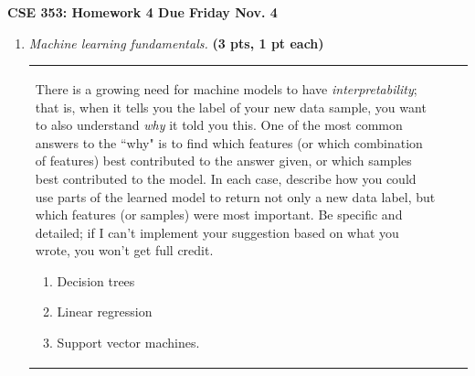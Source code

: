 \documentclass{article}
\newcommand{\mypagebreak}{\begin{center}
		\noindent\makebox[\linewidth]{\rule{7.5in}{1pt}}
	\end{center}}
\newcommand{\showpoints}[1]{\textbf{(#1)}}
\begin{document}
{\Large\textbf{CSE 353: Homework 4 \hfill
Due Friday  Nov. 4}}


\mypagebreak

\begin{enumerate}



\item \emph{Machine learning fundamentals.}  \showpoints{3 pts, 1 pt each}


\begin{tabular}[t]{lll}
\begin{minipage}{.7\linewidth}
There is a growing need for machine models to have \emph{interpretability}; that is, when it tells you the label of your new data sample, you want to also understand \emph{why} it told you this. One of the most common answers to the ``why" is to find which features (or which combination of features) best contributed to the answer given, or which samples best contributed to the model. In each case, describe how you could use parts of the learned model to return not only a new data label, but which features (or samples) were most important. Be specific and detailed; if I can't implement your suggestion based on what you wrote, you won't get full credit. 

\begin{enumerate}
\item  Decision trees


\item Linear regression



\item Support vector machines.



\end{enumerate}
\end{minipage}
\end{tabular}
\end{enumerate}
\end{document}
